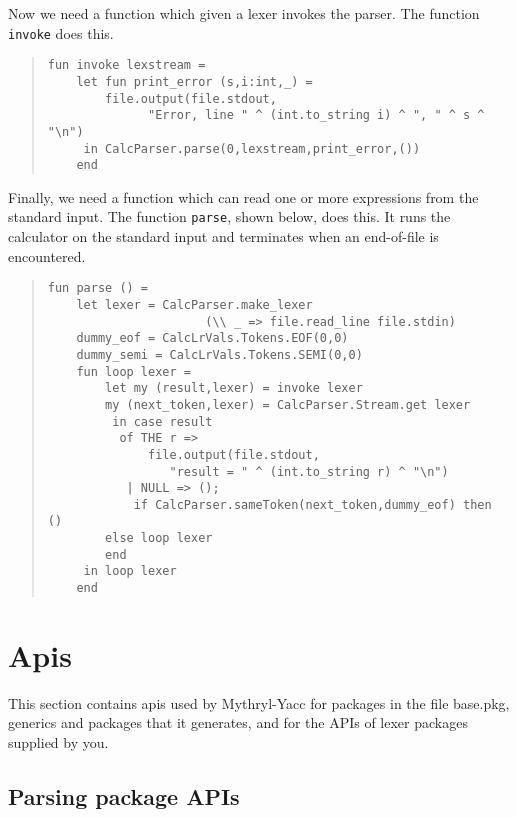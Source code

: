 Now we need a function which given a lexer invokes the parser.  The
function {\tt invoke} does this.

\begin{quote}
\begin{verbatim}
fun invoke lexstream =
    let fun print_error (s,i:int,_) =
	    file.output(file.stdout,
			  "Error, line " ^ (int.to_string i) ^ ", " ^ s ^ "\n")
     in CalcParser.parse(0,lexstream,print_error,())
    end
\end{verbatim}
\end{quote}

Finally, we need a function which can read one or more expressions from
the standard input.  The function {\tt parse}, shown below, does this.
It runs the calculator on the standard input and terminates 
when an end-of-file is encountered.

\begin{quote}
\begin{verbatim}
fun parse () = 
    let lexer = CalcParser.make_lexer
                      (\\ _ => file.read_line file.stdin)
	dummy_eof = CalcLrVals.Tokens.EOF(0,0)
	dummy_semi = CalcLrVals.Tokens.SEMI(0,0)
	fun loop lexer =
	    let my (result,lexer) = invoke lexer
		my (next_token,lexer) = CalcParser.Stream.get lexer
	     in case result
		  of THE r =>
		      file.output(file.stdout,
			     "result = " ^ (int.to_string r) ^ "\n")
		   | NULL => ();
	        if CalcParser.sameToken(next_token,dummy_eof) then ()
		else loop lexer
	    end
     in loop lexer
    end
\end{verbatim}
\end{quote}

\section{Apis}

This section contains apis used by Mythryl-Yacc for packages in
the file base.pkg, generics and packages that it generates, and for
the APIs of lexer packages supplied by you.

\subsection{Parsing package APIs}

